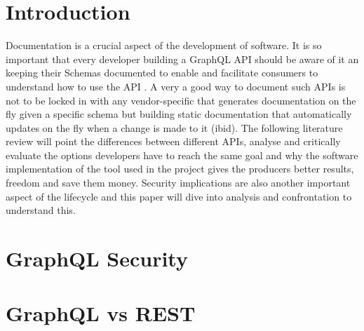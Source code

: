 \section{Introduction}
\label{s:Literature-Introduction}
Documentation is a crucial aspect of the development of software. It is so
important that every developer building a GraphQL API should be aware of it an
keeping their Schemas documented to enable and facilitate consumers to
understand how to use the API \citep{derksDocumentingGraphQLAPIs2021}. A very a
good way to document such APIs is not to be locked in with any vendor-specific
that generates documentation on the fly given a specific schema but building
static documentation that automatically updates on the fly when a change is made
to it (ibid). The following literature review will point the differences between
different APIs, analyse and critically evaluate the options developers have to
reach the same goal and why the software implementation of the tool used in the
project gives the producers better results, freedom and save them money. Security
implications are also another important aspect of the lifecycle and this paper
will dive into analysis and confrontation to understand this.


\section{GraphQL Security}
\label{s:GraphQLSecurity}

\section{GraphQL vs REST}
\label{s:GraphQLvsRest}

